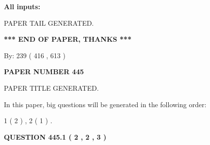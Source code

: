 \documentclass{ctexart}
\begin{document}
   
   
   
\noindent{}
   
   
   
   
\noindent\vspace{0.1in}\hspace{-0.08in} {\textbf{\Large{All inputs: }}}
   
   
   
   
   
   
 \vspace{0.2in}
 
   
   
\vspace{2.0in} PAPER TAIL GENERATED.
   
   
   
   
\vspace{1.0in} 
{\textbf{\large{ *** END OF PAPER, THANKS *** }}} 
   
   
\hspace{1.0in} By: 
 239 ( 416 ,  613 )
   
   
   
   
\newpage 
\setcounter{page}{ 
   445001 } 
   
   
   
   
 {\textbf{ \Large{ PAPER NUMBER  445  }}}
   
   
\vspace{0.2in}
   
   
   
   
   
   
   
   
 \vspace{0.2in}
 
 
 
 
   
   
 PAPER TITLE GENERATED.
   
   
   
\vspace{0.2in}
   
In this paper, big questions will be generated in the following order: 
   
   
   1 ( 2 )
 ,
   2 ( 1 )
 .
  
\vspace{0.2in}
  
{\textbf{\Large{QUESTION
445.1 
 ( 2 , 2 , 3 )
}}}
  
\end{document}
